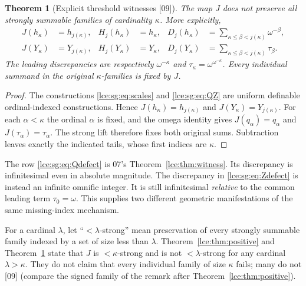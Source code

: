 \documentclass[11pt,letterpaper]{article}
\numberwithin{equation}{section}
\newtheorem{theorem}{Theorem}[section]
\theoremstyle{definition}
\theoremstyle{remark}
\newcommand{\thref}[1]{Theorem~\ref{#1}}
\newcommand{\src}[1]{\textup{\textsf{\small[#1]}}}%
\begin{document}
\begin{theorem}[Explicit threshold witnesses \src{09}]\label{lce:sg:thm:threshold}
The map $J$ does not preserve all strongly summable families of cardinality
$\kappa$. More explicitly,
\begin{align}
 J(h_\kappa)&=h_{j(\kappa)},&
 H_j(h_\kappa)&=h_\kappa,
 &D_j(h_\kappa)&=\sum_{\kappa\le\beta<j(\kappa)}\omega^{-\beta},
 \label{lce:sg:eq:Qdefect}\\
 J(Y_\kappa)&=Y_{j(\kappa)},&
 H_j(Y_\kappa)&=Y_\kappa,
 &D_j(Y_\kappa)&=\sum_{\kappa\le\beta<j(\kappa)}\tau_\beta.
 \label{lce:sg:eq:Zdefect}
\end{align}
The leading discrepancies are respectively $\omega^{-\kappa}$ and
$\tau_\kappa=\omega^{\omega^{-\kappa}}$. Every individual summand in the
original $\kappa$-families is fixed by $J$.
\end{theorem}
\begin{proof}
The constructions \eqref{lce:sg:eq:scales} and \eqref{lce:sg:eq:QZ} are
uniform definable ordinal-indexed constructions. Hence
$J(h_\kappa)=h_{j(\kappa)}$ and $J(Y_\kappa)=Y_{j(\kappa)}$. For each
$\alpha<\kappa$ the ordinal $\alpha$ is fixed, and the omega identity gives
$J(q_\alpha)=q_\alpha$ and $J(\tau_\alpha)=\tau_\alpha$. The strong lift
therefore fixes both original sums. Subtraction leaves exactly the
indicated tails, whose first indices are $\kappa$.
\end{proof}
The row \eqref{lce:sg:eq:Qdefect} is 07's \thref{lce:thm:witness}. Its
discrepancy is infinitesimal even in absolute magnitude. The discrepancy in
\eqref{lce:sg:eq:Zdefect} is instead an infinite omnific integer. It is still
infinitesimal \emph{relative} to the common leading term $\tau_0=\omega$.
This supplies two different geometric manifestations of the same
missing-index mechanism.

For a cardinal $\lambda$, let ``$<\lambda$-strong'' mean preservation of
every strongly summable family indexed by a set of size less than
$\lambda$. \thref{lce:thm:positive} and \thref{lce:sg:thm:threshold} state
that $J$ is $<\kappa$-strong and is not $<\lambda$-strong for any cardinal
$\lambda>\kappa$. They do not claim that every individual family of size
$\kappa$ fails; many do not \src{09} (compare the signed family of the
remark after \thref{lce:thm:positive}).
\end{document}
